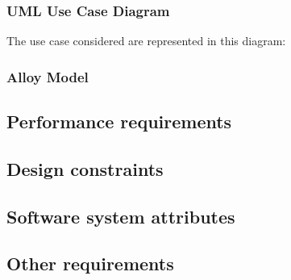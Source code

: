 \subsubsection{UML Use Case Diagram}
The use case considered are represented in this diagram: 


\subsubsection{Alloy Model}
\subsection{Performance requirements}
\subsection{Design constraints}
\subsection{Software system attributes}
\subsection{Other requirements}
